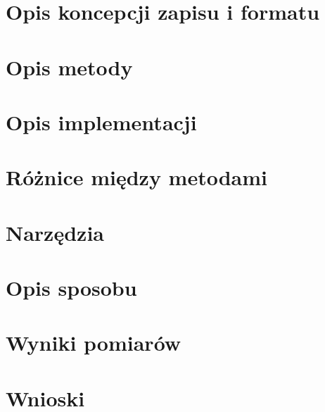 \documentclass{article}
\begin{document}
\section{Opis koncepcji zapisu i formatu}

\section{Opis metody}

\newpage
\section{Opis implementacji}

\newpage
\section{Różnice między metodami}

\section{Narzędzia}

\section{Opis sposobu}

\newpage
\section{Wyniki pomiarów}

\newpage
\section{Wnioski}


\newpage
{}
{}


\end{document}
